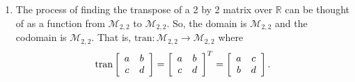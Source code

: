 \begin{enumerate}
\begin{enumerate}
\item The process of finding the transpose of a 2 by 2 matrix over $\mathbb{R}$ can be thought of as a function from $\mathcal{M}_{2, 2}$ to $\mathcal{M}_{2, 2}$.  So, the domain is 
$\mathcal{M}_{2, 2}$ and the codomain is $\mathcal{M}_{2, 2}$.  That is, 
$\text{tran} : \mathcal{M}_{2, 2} \to \mathcal{M}_{2, 2}$ where
\[
\text{tran}\left[ {\begin{array}{*{20}c}
   a & b  \\
   c & d  \\
\end{array} } \right] = \left[ {\begin{array}{*{20}c}
   a & b  \\
   c & d  \\
\end{array} } \right]^T = \left[ {\begin{array}{*{20}c}
   a & c  \\
   b & d  \\
\end{array} } \right].
\]
\end{enumerate}


\end{enumerate}
\hbreak

\endinput
